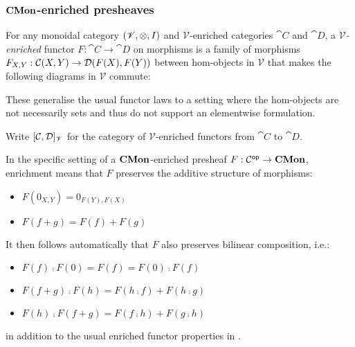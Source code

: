 \subsubsection{$\mathbf{CMon}$-enriched presheaves}

\begin{definition}
\label{def:cmon-enriched:enriched-functor}
For any monoidal category $(\mathscr{V}, \otimes, I)$ and $\mathscr{V}$-enriched categories $\cat{C}$ and
$\cat{D}$, a \emph{$\mathscr{V}$-enriched} functor $F: \cat{C} \to \cat{D}$ on morphisms is a family of
morphisms $F_{X,Y}: {\mathcal{C}}(X,Y) \to {\mathcal{D}}(F(X),F(Y))$ between hom-objects in $\mathscr{V}$
that makes the following diagrams in $\mathscr{V}$ commute:

\begin{center}
\hspace{5mm}
\end{center}
\end{definition}

\noindent These generalise the usual functor laws to a setting where the hom-objects are not necessarily sets
and thus do not support an elementwise formulation.

\begin{definition}
Write $[\mathcal{C},\mathcal{D}]_{\mathscr{V}}$ for the category of $\mathscr{V}$-enriched functors from
$\cat{C}$ to $\cat{D}$.
\end{definition}

In the specific setting of a $\mathbf{CMon}$-enriched presheaf $F: \mathcal{C}^{\mathsf{op}} \to \mathbf{CMon}$, enrichment means that $F$
preserves the additive structure of morphisms:
\begin{itemize}
\item $F(0_{X,Y}) = 0_{F(Y),F(X)}$
\item $F(f + g) = F(f) + F(g)$
\end{itemize}
It then follows automatically that $F$ also preserves bilinear composition, i.e.:
\begin{itemize}
\item $F(f) \comp F(0) = F(f) = F(0) \comp F(f)$
\item $F(f + g) \comp F(h) = F(h \comp f) + F(h \comp g)$
\item $F(h) \comp F(f + g) = F(f \comp h) + F(g \comp h)$
\end{itemize}
in addition to the usual enriched functor properties in .

